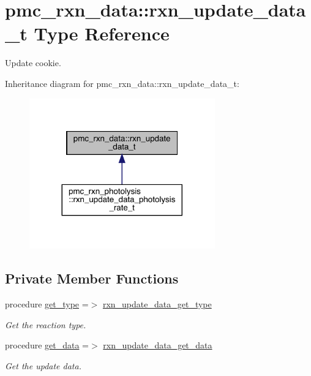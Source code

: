\hypertarget{structpmc__rxn__data_1_1rxn__update__data__t}{}\section{pmc\+\_\+rxn\+\_\+data\+:\+:rxn\+\_\+update\+\_\+data\+\_\+t Type Reference}
\label{structpmc__rxn__data_1_1rxn__update__data__t}


Update cookie.  




Inheritance diagram for pmc\+\_\+rxn\+\_\+data\+:\+:rxn\+\_\+update\+\_\+data\+\_\+t\+:\nopagebreak
\begin{figure}[H]
\begin{center}
\leavevmode
\includegraphics[width=227pt]{structpmc__rxn__data_1_1rxn__update__data__t__inherit__graph}
\end{center}
\end{figure}
\subsection*{Private Member Functions}
\begin{DoxyCompactItemize}
\item 
procedure \mbox{\hyperlink{structpmc__rxn__data_1_1rxn__update__data__t_aa96ea38cbbfd110287d3b533f4844325}{get\+\_\+type}} =$>$ \mbox{\hyperlink{namespacepmc__rxn__data_af7376f50bad1c8b21e68568ed7dfdf81}{rxn\+\_\+update\+\_\+data\+\_\+get\+\_\+type}}
\begin{DoxyCompactList}\small\item\em Get the reaction type. \end{DoxyCompactList}\item 
procedure \mbox{\hyperlink{structpmc__rxn__data_1_1rxn__update__data__t_aa394fd7c9af151a007c31c27824ff4f3}{get\+\_\+data}} =$>$ \mbox{\hyperlink{namespacepmc__rxn__data_a5eb5b555b9ce82e70a70568f33e97b46}{rxn\+\_\+update\+\_\+data\+\_\+get\+\_\+data}}
\begin{DoxyCompactList}\small\item\em Get the update data. \end{DoxyCompactList}\end{DoxyCompactItemize}
